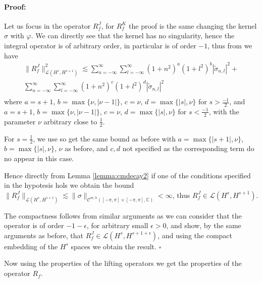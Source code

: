 \documentclass{article}
\newenvironment{proof}{\paragraph{Proof:}}{\hfill$\square$}
\newcommand{\IC}{{\mathbb C}}
\newcommand{\cmspaceh}[4]{\mathcal{C}^{#1,#2} \left( #3, #4 \right)}
\begin{document}
\begin{proof}
Let us focus in the operator $R_f^J$, for $R_f^K$ the proof is the same changing the kernel $\sigma$ with $\varphi$. We can directly see that the kernel has no singularity, hence the integral operator is of arbitrary order, in particular is of order $-1$, thus from \cite[Theorem 6.1.3]{saranen2013periodic} we have 
\begin{align*}
\| R^J_f\|_{ \mathcal{L}(H^{s},H^{s+1})}^2 \lesssim \sum_{n=-\infty}^\infty \sum_{l=-\infty}^\infty  (1+n^2)^{a}(1+l^2)^{b}|\widetilde{\sigma}_{n,l}|^2+\\
\sum_{n=-\infty}^\infty \sum_{l=-\infty}^\infty  (1+n^2)^{c}(1+l^2)^{d}|\widetilde{\sigma}_{n,l}|^2\\
\end{align*}
where $a=s+1$, $b = \max\{\nu, |\nu-1|\}$, $c = \nu $, $d= \max \{ |s|,\nu\}$ for $s > \frac{-1}{2}$, and $a=s+1$, $b = \max\{\nu, |\nu-1|\}$, $c = \nu $, $d= \max \{ |s|,\nu\}$ for $s <\frac{-1}{2}$, with the parameter $\nu$ arbitrary close to $\frac{1}{2}$.

For $s=\frac{1}{2}$, we use \cite[Theorem 6.1.1]{saranen2013periodic} so get the same bound as before with $a =\max\{ |s+1|,\nu\}$, $b=\max\{|s|,\nu\}$, $\nu$ as before, and $c,d$ not specified as the corresponding term do no appear in this case.

Hence directly from Lemma \ref{lemma:cmdecay2} if one of the conditions specified in the hypotesis hols we obtain the bound $\| R_f^J\|_{ \mathcal{L}(H^{s},H^{s+1})} \lesssim \|\sigma\|_{\cmspaceh{m}{h}{[-\pi,\pi]\times[-\pi,\pi]}{\IC}} < \infty$, thus  
$R_f^J \in \mathcal{L}(H^{s},H^{s+1})$.

The compactness follows from similar arguments as we can consider that the operator  is of order $-1-\epsilon$, for arbitrary small $\epsilon>0$, and show, by the same arguments as before, that $R_f^J \in \mathcal{L}\left(H^s,H^{s+1+\epsilon}\right)$, and using the compact embedding of the $H^{s}$ spaces we obtain the result.
\end{proof}

Now using the properties of the lifting operators we get the properties of the operator $R_f$. 
\end{document}
